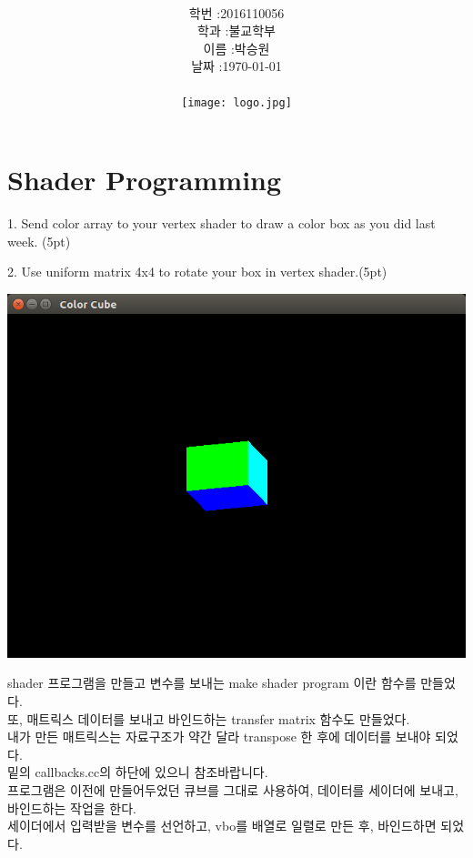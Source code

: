 \documentclass[12pt,a4paper]{article}
\title{
	\centering
	\pgfornament[width=12cm,color=teal]{84}\\
	\vspace{1cm}
	\fontsize{50}{50} \selectfont {컴퓨터 그래픽스 입문}\\
		\pgfornament[width=12cm,color=teal]{88}\\
	\vfill}
\author{
	\LARGE
	\begin{tabular}{rl}
		\hline
		학번 : & 2016110056\\ 
		학과 : & 불교학부 \\
		이름 : & 박승원\\
		날짜 : & \today\\
		\hline
	\end{tabular}\vspace{2cm}
	\\
\texttt{[image: logo.jpg]}
	}
\date{}
\begin{document}
\maketitle
{}
\noindent
\lstset{language=C++, columns=flexible, tabsize=4, frame=shadowbox, showstringspaces=false, breaklines=true, upquote=true, basicstyle=\normalsize}

\section{Shader Programming}
1. Send color array to your vertex shader to draw a color box as you did last week. (5pt)

2. Use uniform matrix 4x4 to rotate your box in vertex shader.(5pt)

\includegraphics[width=\textwidth]{1.png}

	
	
	

shader 프로그램을 만들고 변수를 보내는 make shader program 이란 함수를 만들었다.\\
또, 매트릭스 데이터를 보내고 바인드하는 transfer matrix 함수도 만들었다.\\
내가 만든 매트릭스는 자료구조가 약간 달라 transpose 한 후에 데이터를 보내야 되었다.\\
밑의 callbacks.cc의 하단에 있으니 참조바랍니다.\\

프로그램은 이전에 만들어두었던 큐브를 그대로 사용하여, 데이터를 세이더에 보내고, 바인드하는 작업을 한다.\\
세이더에서 입력받을 변수를 선언하고, vbo를 배열로 일렬로 만든 후, 바인드하면 되었다.

	
\end{document}

